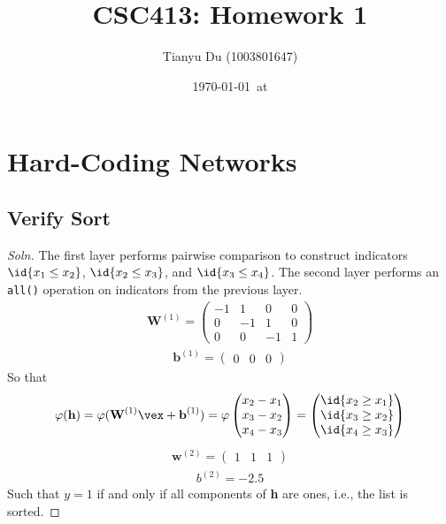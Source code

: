 \documentclass{article}
\title{CSC413: Homework 1}
\date{\today\ at \currenttime}
\author{Tianyu Du (1003801647)}
\begin{document}
    \maketitle
    \section{Hard-Coding Networks}
    \subsection{Verify Sort}
    \begin{proof}[Soln]
    	The first layer performs pairwise comparison to construct indicators $\id{x_1 \leq x_2}$, $\id{x_2 \leq x_3}$, and $\id{x_3 \leq x_4}$. The second layer performs an \texttt{all()} operation on indicators from the previous layer.
    	\begin{align}
    		\textbf{W}^{(1)} = 
    		\begin{pmatrix}
    			-1 & 1 & 0 & 0 \\
    			0 & -1 & 1 & 0 \\
    			0 & 0 & -1 & 1
    		\end{pmatrix}
    	\end{align}
    	\begin{align}
    		\textbf{b}^{(1)} = 
    		\begin{pmatrix}
    			0 & 0 & 0
    		\end{pmatrix}
    	\end{align}
    	So that 
    	\begin{align}
    		\varphi(\textbf{h}) = \varphi(\textbf{W}^{(1)} \vex + \textbf{b}^{(1)}) =
    		\varphi \begin{pmatrix}
    			x_2 - x_1 \\
    			x_3 - x_2 \\
    			x_4 - x_3
    		\end{pmatrix} =
    		\begin{pmatrix}
    			\id{x_2 \geq x_1} \\
    			\id{x_3 \geq x_2} \\
    			\id{x_4 \geq x_3}
    		\end{pmatrix}
    	\end{align}
    	\begin{align}
    		\textbf{w}^{(2)} = 
    		\begin{pmatrix}
    			1 & 1 & 1
    		\end{pmatrix}
    	\end{align}
    	\begin{align}
    		b^{(2)} = - 2.5
    	\end{align}
    	Such that $y = 1$ if and only if all components of \textbf{h} are ones, i.e., the list is sorted.
    \end{proof}
\end{document}
